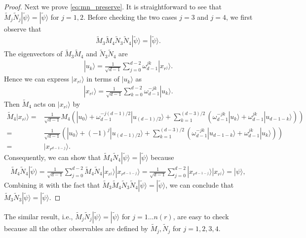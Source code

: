 \documentclass[11pt,letterpaper]{article}
\newcommand{\ket}[1]{|#1\rangle}
\newcommand{\1}{\mathbb{1}}
\newcommand{\tM}{\tilde{M}}
\newcommand{\tN}{\tilde{N}}
\newcommand{\tpsi}{\tilde{\psi}}
\newcommand{\nr}{n(r)}
\theoremstyle{definition}
\begin{document}
\begin{proof}
	Next we prove \cref{eq:mn_preserve}. It is straightforward to see that $\tM_j\tN_j \ket{\tpsi} = \ket{\tpsi}$ for $j = 1,2$.
	Before checking the two cases $j=3$ and $j=4$, we first observe that
	\begin{align*}
		\tM_3\tM_4 \tN_3 \tN_4 \ket{\tpsi} = \ket{\tpsi}.
	\end{align*}
	The eigenvectors of $\tM_3\tM_4$ and $\tN_3\tN_4$ are 
    \begin{align*}
        \ket{u_k} = \frac{1}{\sqrt{d-1}} \sum_{j=0}^{d-2} \omega_{d-1}^{jk} \ket{x_{r^j}}.
    \end{align*}
    Hence we can express $\ket{x_{r^j}}$ in terms of $\ket{u_k}$ as 
    \begin{align*}
        \ket{x_{r^j}} = \frac{1}{\sqrt{d-1}} \sum_{k=0}^{d-2} \omega_{d-1}^{-jk} \ket{u_k}.
    \end{align*}
    Then $\tM_4$ acts on $\ket{x_{r^j}}$ by
    \begin{align*}
        \tM_4 \ket{x_{r^j}} =& \frac{1}{\sqrt{d-1}} M_4\left(\ket{u_0} + \omega_{d-1}^{-j(d-1)/2}\ket{u_{(d-1)/2}}  + 
        \sum_{k=1}^{(d-3)/2} (\omega_{d-1}^{-jk} \ket{u_k} + \omega_{d-1}^{jk} \ket{u_{d-1-k}})\right) \\
        =&\frac{1}{\sqrt{d-1}} \left(\ket{u_0} + (-1)^j\ket{u_{(d-1)/2}}  + 
        \sum_{k=1}^{(d-3)/2} (\omega_{d-1}^{-jk} \ket{u_{d-1-k}} + \omega_{d-1}^{jk} \ket{u_{k}})\right) \\
        =& \ket{x_{r^{d-1-j}}}.
    \end{align*}
    Consequently, we can show that $\tM_4  \tN_4 \ket{\tpsi} = \ket{\tpsi}$ because
    \begin{align*}
        \tM_4 \tN_4 \ket{\tpsi} = \frac{1}{\sqrt{d-1}}  \sum_{j=0}^{d-2} \tM_4  \tN_4 \ket{x_{r^j}} \ket{x_{r^{d-1-j}}} 
        = \frac{1}{\sqrt{d-1}} \sum_{j=0}^{d-2} \ket{x_{r^{d-1-j}}} \ket{x_{r^{j}}} =\ket{\psi},
    \end{align*}
	Combining it with the fact that $\tM_3\tM_4 \tN_3\tN_4 \ket{\tpsi} = \ket{\tpsi}$, we can conclude that
	$\tM_3\tN_3 \ket{\tpsi} = \ket{\tpsi}$.
\end{proof}
The similar result, i.e., $\tM_j\tN_j \ket{\tpsi} = \ket{\tpsi}$ for $j = 1 \dots \nr$, are easy to check because all the other observables are defined by $\tM_j, \tN_j$ for $j=1,2,3,4$.


\end{document}
